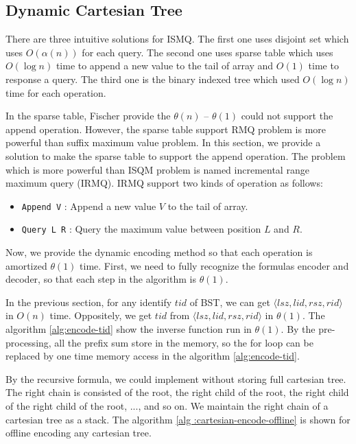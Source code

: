 

\subsection{Dynamic Cartesian Tree}

There are three intuitive solutions for ISMQ.  The first one uses
disjoint set which uses $O(\alpha(n))$ for each query.  The second one
uses sparse table which uses $O(\log n)$ time to append a new value to
the tail of array and $O(1)$ time to response a query.  The third one
is the binary indexed tree which used $O(\log n)$ time for each
operation.

In the sparse table, Fischer provide the $\theta(n)$ -- $\theta(1)$
could not support the append operation.  However, the sparse table
support RMQ problem is more powerful than suffix maximum value
problem.  In this section, we provide a solution to make the sparse
table to support the append operation.  The problem which is more
powerful than ISQM problem is named incremental range maximum query
(IRMQ).  IRMQ support two kinds of operation as follows:

\begin{itemize}
  \item 
  	\texttt{Append V} : Append a new value $V$ to the tail of array.

  \item
    \texttt{Query L R} : Query the maximum value between position $L$
and $R$. 

\end{itemize}

Now, we provide the dynamic encoding method so that each operation is
amortized $\theta(1)$ time.  First, we need to fully recognize the
formulas encoder and decoder, so that each step in the algorithm is
$\theta(1)$.

In the previous section, for any identify $\mathit{tid}$ of BST, we
can get
$\langle\mathit{lsz},\mathit{lid},\mathit{rsz},\mathit{rid}\rangle$ in
$O(n)$ time.  Oppositely, we get $\mathit{tid}$ from
$\langle\mathit{lsz},\mathit{lid},\mathit{rsz},\mathit{rid}\rangle$ in
$\theta(1)$.  The algorithm \ref{alg:encode-tid} show the inverse
function run in $\theta(1)$.  By the pre-processing, all the prefix
sum store in the memory, so the for loop can be replaced by one time
memory access in the algorithm \ref{alg:encode-tid}.



By the recursive formula,  we could implement without storing full
cartesian tree.  The right chain is consisted of the root, the right
child of the root, the right child of the right child of the root,
..., and so on.  We maintain the right chain of a cartesian tree as a
stack.  The algorithm \ref{alg :cartesian-encode-offline} is shown for
offline encoding any cartesian tree.


